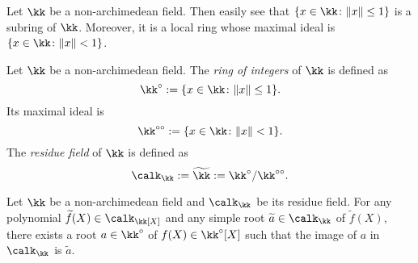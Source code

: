     Let \(\kk\) be a non-archimedean field.
    Then easily see that \(\{x \in \kk\colon \|x\|\leq 1\}\) is a subring of \(\kk\).
    Moreover, it is a local ring whose maximal ideal is \(\{x \in \kk\colon \|x\| < 1\}\).

    \begin{definition}\label{def:non-archimedean_field_ring_of_integers_maximal_ideal_and_residue_field}
        Let \(\kk\) be a non-archimedean field.
        The \emph{ring of integers} of \(\kk\) is defined as
        \[ \kk^\circ := \{x \in \kk\colon \|x\|\leq 1\}. \]
        Its maximal ideal is
        \[ \kk^{\circ\circ} := \{x \in \kk\colon \|x\| < 1\}. \]
        The \emph{residue field} of \(\kk\) is defined as
        \[ \calk_\kk := \widetilde{\kk} := \kk^\circ / \kk^{\circ\circ}. \]
    \end{definition}


    \begin{theorem}\label{thm:Hessel_lemma}
        Let \(\kk\) be a non-archimedean field and \(\calk_\kk\) be its residue field.
        For any polynomial \(\widetilde{f}(X) \in \calk_\kk[X]\) and any simple root \(\widetilde{a} \in \calk_\kk\) of \(\widetilde{f}(X)\), there exists a root \(a \in \kk^\circ\) of \(f(X) \in \kk^\circ[X]\) such that the image of \(a\) in \(\calk_\kk\) is \(\widetilde{a}\).
    \end{theorem}



